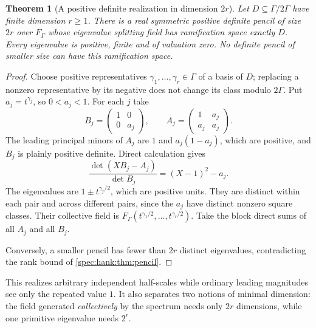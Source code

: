 \documentclass[11pt,a4paper]{article}
\numberwithin{equation}{section}
\newtheorem{theorem}{Theorem}[section]
\theoremstyle{definition}
\theoremstyle{remark}
\begin{document}
\begin{theorem}[A positive definite realization in dimension $2r$]
\label{spec:hank:thm:realization}
Let $D\subseteq\Gamma/2\Gamma$ have finite dimension $r\ge1$. There is a real
symmetric positive definite pencil of size $2r$ over $F_\Gamma$ whose
eigenvalue splitting field has ramification space exactly $D$. Every
eigenvalue is positive, finite and of valuation zero. No definite pencil of
smaller size can have this ramification space.
\end{theorem}
\begin{proof}
Choose positive representatives $\gamma_1,\ldots,\gamma_r\in\Gamma$ of a basis
of $D$; replacing a nonzero representative by its negative does not change
its class modulo $2\Gamma$. Put $a_j=t^{\gamma_j}$, so $0<a_j<1$. For each $j$
take
\begin{equation}\label{spec:hank:eq:block}
 B_j=\begin{pmatrix}1&0\\0&a_j\end{pmatrix},\qquad
 A_j=\begin{pmatrix}1&a_j\\a_j&a_j\end{pmatrix}.
\end{equation}
The leading principal minors of $A_j$ are $1$ and $a_j(1-a_j)$, which are
positive, and $B_j$ is plainly positive definite. Direct calculation gives
\[
 \frac{\det(XB_j-A_j)}{\det B_j}=(X-1)^2-a_j.
\]
The eigenvalues are $1\pm t^{\gamma_j/2}$, which are positive units. They are
distinct within each pair and across different pairs, since the $a_j$ have
distinct nonzero square classes. Their collective field is
$F_\Gamma(t^{\gamma_1/2},\ldots,t^{\gamma_r/2})$. Take the block direct sums of
all $A_j$ and all $B_j$.

Conversely, a smaller pencil has fewer than $2r$ distinct eigenvalues,
contradicting the rank bound of \cref{spec:hank:thm:pencil}.
\end{proof}

This realizes arbitrary independent half-scales while ordinary leading
magnitudes see only the repeated value $1$. It also separates two notions of
minimal dimension: the field generated \emph{collectively} by the spectrum
needs only $2r$ dimensions, while one primitive eigenvalue needs $2^r$.
\end{document}
